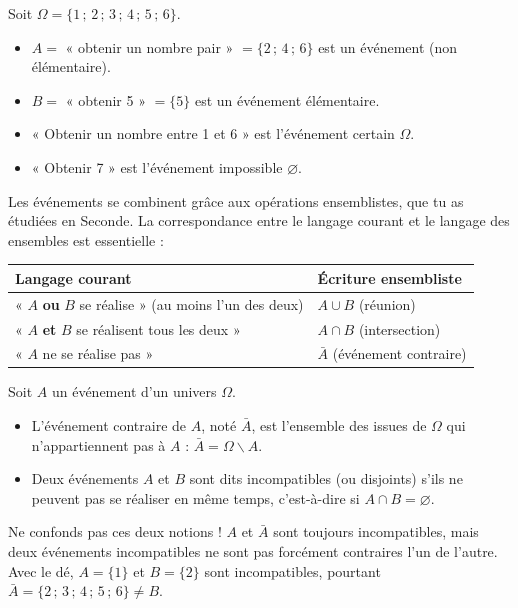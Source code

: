 \documentclass[11pt]{article}
\newcommand{\cle}[1]{{\popxbold\color{popdark}#1}}
\def\setminus{\mathbin{\backslash}}\let\smallsetminus\setminus
\begin{document}
\begin{exemplebox}
Soit $\Omega = \{1\,;\,2\,;\,3\,;\,4\,;\,5\,;\,6\}$.
\begin{itemize}
\item $A = $ « obtenir un nombre pair » $= \{2\,;\,4\,;\,6\}$ est un événement (non élémentaire).
\item $B = $ « obtenir 5 » $= \{5\}$ est un événement élémentaire.
\item « Obtenir un nombre entre 1 et 6 » est l'événement certain $\Omega$.
\item « Obtenir 7 » est l'événement impossible $\varnothing$.
\end{itemize}
\end{exemplebox}

Les événements se combinent grâce aux opérations ensemblistes, que tu as étudiées en Seconde. La correspondance entre le langage courant et le langage des ensembles est essentielle :

\begin{center}
\begin{tabularx}{\linewidth}{|l|X|}
\hline
\rowcolor{popblueL} \textbf{Langage courant} & \textbf{Écriture ensembliste} \\
\hline
« $A$ \textbf{ou} $B$ se réalise » (au moins l'un des deux) & $A \cup B$ (réunion) \\
\hline
« $A$ \textbf{et} $B$ se réalisent tous les deux » & $A \cap B$ (intersection) \\
\hline
« $A$ ne se réalise pas » & $\bar{A}$ (événement contraire) \\
\hline
\end{tabularx}
\end{center}

\begin{definition}
Soit $A$ un événement d'un univers $\Omega$.
\begin{itemize}
\item L'\cle{événement contraire} de $A$, noté $\bar{A}$, est l'ensemble des issues de $\Omega$ qui n'appartiennent pas à $A$ : $\bar{A} = \Omega \setminus A$.
\item Deux événements $A$ et $B$ sont dits \cle{incompatibles} (ou disjoints) s'ils ne peuvent pas se réaliser en même temps, c'est-à-dire si $A \cap B = \varnothing$.
\end{itemize}
\end{definition}

\begin{attention}
Ne confonds pas ces deux notions ! $A$ et $\bar{A}$ sont toujours incompatibles, mais deux événements incompatibles ne sont pas forcément contraires l'un de l'autre. Avec le dé, $A = \{1\}$ et $B = \{2\}$ sont incompatibles, pourtant $\bar{A} = \{2\,;\,3\,;\,4\,;\,5\,;\,6\} \neq B$.
\end{attention}
\end{document}
